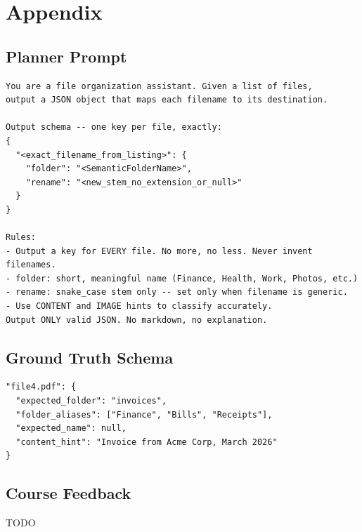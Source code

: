 \documentclass{article}
\begin{document}
\clearpage
\appendix
\section*{Appendix}

\subsection{Planner Prompt}

\begin{lstlisting}[language={}]
You are a file organization assistant. Given a list of files,
output a JSON object that maps each filename to its destination.

Output schema -- one key per file, exactly:
{
  "<exact_filename_from_listing>": {
    "folder": "<SemanticFolderName>",
    "rename": "<new_stem_no_extension_or_null>"
  }
}

Rules:
- Output a key for EVERY file. No more, no less. Never invent filenames.
- folder: short, meaningful name (Finance, Health, Work, Photos, etc.)
- rename: snake_case stem only -- set only when filename is generic.
- Use CONTENT and IMAGE hints to classify accurately.
Output ONLY valid JSON. No markdown, no explanation.
\end{lstlisting}

\subsection{Ground Truth Schema}

\begin{lstlisting}[language={}]
"file4.pdf": {
  "expected_folder": "invoices",
  "folder_aliases": ["Finance", "Bills", "Receipts"],
  "expected_name": null,
  "content_hint": "Invoice from Acme Corp, March 2026"
}
\end{lstlisting}

\subsection{Course Feedback}

TODO
\end{document}

